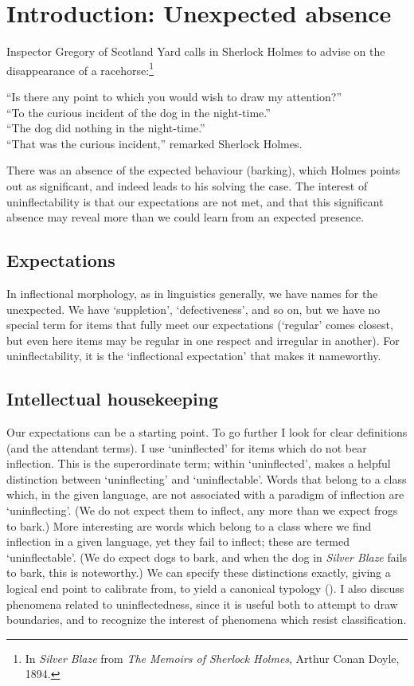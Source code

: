 \documentclass[output=paper]{langscibook}
\begin{document}
\section{\textbf{Introduction:} \textbf{Unexpected} \textbf{absence}}

Inspector Gregory of Scotland Yard calls in Sherlock Holmes to advise on the disappearance of a racehorse:\footnote{In \textit{Silver Blaze} from \textit{The Memoirs of Sherlock Holmes}, Arthur Conan Doyle, 1894.}  

“Is there any point to which you would wish to draw my attention?” \\
“To the curious incident of the dog in the night-time.” \\
“The dog did nothing in the night-time.” \\
“That was the curious incident,” remarked Sherlock Holmes.

There was an absence of the expected behaviour (barking), which Holmes points out as significant, and indeed leads to his solving the case. The interest of uninflectability is that our expectations are not met, and that this significant absence may reveal more than we could learn from an expected presence. 

\subsection{\textbf{Expectations}}

In inflectional morphology, as in linguistics generally, we have names for the unexpected. We have ‘suppletion’, ‘defectiveness’, and so on, but we have no special term for items that fully meet our expectations (‘regular’ comes closest, but even here items may be regular in one respect and irregular in another). For uninflectability, it is the ‘inflectional expectation’ \citep[146]{Spencer2020} that makes it nameworthy.

\subsection{\textbf{Intellectual} \textbf{housekeeping}}

Our expectations can be a starting point. To go further I look for clear definitions (and the attendant terms). I use ‘uninflected’ for items which do not bear inflection. This is the superordinate term; within ‘uninflected’, \citet[142]{Spencer2020} makes a helpful distinction between ‘uninflecting’ and ‘uninflectable’. Words that belong to a class which, in the given language, are not associated with a paradigm of inflection are ‘uninflecting’. (We do not expect them to inflect, any more than we expect frogs to bark.) More interesting are words which belong to a class where we find inflection in a given language, yet they fail to inflect; these are termed ‘uninflectable’. (We do expect dogs to bark, and when the dog in \textit{Silver Blaze} fails to bark, this is noteworthy.) We can specify these distinctions exactly, giving a logical end point to calibrate from, to yield a canonical typology (). I also discuss phenomena related to uninflectedness, since it is useful both to attempt to draw boundaries, and to recognize the interest of phenomena which resist classification.
\end{document}
